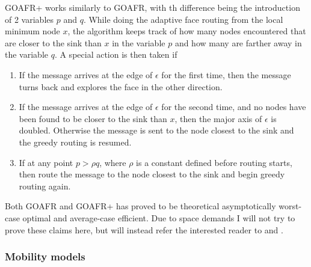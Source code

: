 GOAFR+ works similarly to GOAFR, with th difference being the introduction of 2 variables $p$ and $q$. While doing the adaptive face routing from the local minimum node $x$, the algorithm keeps track of how many nodes encountered that are closer to the sink than $x$ in the variable $p$ and how many are farther away in the variable $q$.
A special action is then taken if
\begin{enumerate}
\item If the message arrives at the edge of $\epsilon$ for the first time, then the message turns back and explores the face in the other direction. 
\item If the message arrives at the edge of $\epsilon$ for the second time, and no nodes have been found to be closer to the sink than $x$, then the major axis of $\epsilon$ is doubled. Otherwise the message is sent to the node closest to the sink and the greedy routing is resumed.
\item If at any point $p > \rho q$, where $\rho$ is a constant defined before routing starts, then route the message to the node closest to the sink and begin greedy routing again.
\end{enumerate}

Both GOAFR and GOAFR+ has proved to be theoretical asymptotically worst-case optimal and average-case efficient. Due to space demands I will not try to prove these claims here, but will instead refer the interested reader to \cite{gopher+} and \cite{gopher}.

\subsubsection{Mobility models}
